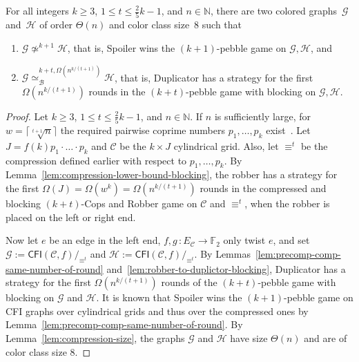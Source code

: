 \documentclass[a4paper,english, thm-restate]{lipics-v2021}
\newcommand{\comp}{\equiv}
\newcommand{\CFIsym}{\mathsf{CFI}}
\newcommand{\CFI}[1]{\CFIsym(#1)}
\newcommand{\compCFI}[2]{\CFI{#1}/_{#2}}
\newcommand{\nat}{\mathbb{N}}
\newcommand{\FF}{\mathbb{F}}
\newcommand{\graphG}{\mathcal{G}}
\newcommand{\graphH}{\mathcal{H}}
\newcommand{\edgeC}{E_{\mathcal{C}}}
\newcommand{\kbequivr}[2]{\simeq_{\mathcal{B}}^{#1,#2}}
\newcommand{\notkequiv}[1]{\not\simeq^{#1}}
\begin{document}
\begin{theorem}
	For all integers $k\geq 3$, $1\leq t \leq \frac{2}{5}k-1$, and $n\in \nat$,
	there are  
	two colored graphs~$\graphG$ and~$\graphH$ of order $\Theta(n)$ and color class size~$8$
	such that
	\begin{enumerate}
		\item $\graphG \notkequiv{k+1} \graphH$, that is, Spoiler wins the $(k+1)$-pebble game on $\graphG, \graphH$,
		and 
		\item $\graphG \kbequivr{k+t}{\Omega(n^{k/(t+1)})} \graphH $,
		that is, Duplicator has a strategy for the first $\Omega(n^{k/(t+1)})$
		rounds in the $(k+t)$-pebble game with blocking on $\graphG, \graphH$.
	\end{enumerate}
\end{theorem}
\begin{proof}
	Let $k \geq 3$, $1\leq t \leq  \frac{2}{5}k-1$, and $n \in \nat$.
	If $n$ is sufficiently large,
	for $w = \lceil\sqrt[t+1]{n} \rceil$ the required pairwise coprime numbers $p_1,\dots, p_k$ exist~\cite{DBLP:conf/focs/GroheLNS23}.
	Let $J = f(k) p_1\cdot\ldots \cdot p_k$
	and $\mathcal{C}$ be the $k\times J$ cylindrical grid.
	Also, let $\comp^t$ be the compression defined earlier with respect
	to $p_1,\dots, p_k$.
	By Lemma~\ref{lem:compression-lower-bound-blocking},
	the robber has a strategy for the first $\Omega( J) = \Omega(w^k) = \Omega(n^{k/(t+1)})$
	rounds in the compressed and blocking $(k+t)$-Cops and Robber game
	on $\mathcal{C}$ and $\comp^t$, when the robber is placed on the left or right end. 
	
	Now let $e$ be an edge in the left end,
	$f,g \, \colon \edgeC \to \FF_2$ only twist $e$,
	and set $\graphG :=\compCFI{\mathcal{C},f}{\comp^t}$ and $\graphH :=\compCFI{\mathcal{C},f}{\comp^t}$.
	By Lemmas~\ref{lem:precomp-comp-same-number-of-round}
	and~\ref{lem:robber-to-duplictor-blocking},
	Duplicator has a strategy for the first  $\Omega(n^{k/(t+1)})$
	rounds of the $(k+t)$-pebble game with blocking
	on $\graphG$ and $\graphH$.
	It is known that Spoiler wins the $(k+1)$-pebble game
	on CFI graphs over cylindrical grids and thus over the compressed ones
	by Lemma~\ref{lem:precomp-comp-same-number-of-round}.
	By Lemma~\ref{lem:compression-size},
	the graphs $\graphG$ and $\graphH$ have size $\Theta(n)$
	and are of color class size $8$.
\end{proof}
         
\end{document}
